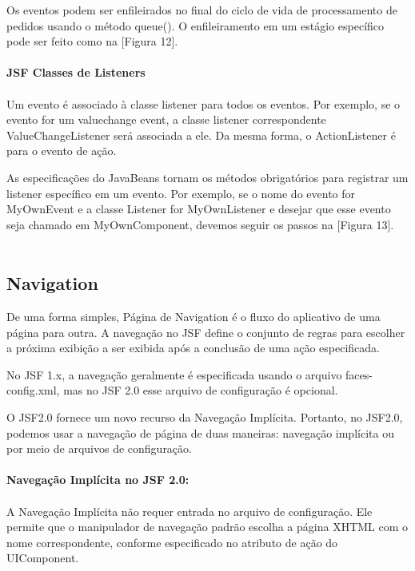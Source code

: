 \documentclass[	DIV=calc,%
							paper=a4,%
							fontsize=12pt,%
							onecolumn]{scrartcl}	 					%
\begin{document}
Os eventos podem ser enfileirados no final do ciclo de vida de processamento de pedidos usando o método queue(). O enfileiramento em um estágio específico pode ser feito como na [Figura 12].\\~\\

\textbf{JSF Classes de Listeners}\\~\\

Um evento é associado à classe listener para todos os eventos. Por exemplo, se o evento for um valuechange event, a classe listener correspondente ValueChangeListener será associada a ele. Da mesma forma, o ActionListener é para o evento de ação.

As especificações do JavaBeans tornam os métodos obrigatórios para registrar um listener específico em um evento. Por exemplo, se o nome do evento for MyOwnEvent e a classe Listener for MyOwnListener e desejar que esse evento seja chamado em MyOwnComponent, devemos seguir os passos na [Figura 13].\\~\\


\subsection{Navigation}

De uma forma simples, Página de Navigation é o fluxo do aplicativo de uma página para outra. A navegação no JSF define o conjunto de regras para escolher a próxima exibição a ser exibida após a conclusão de uma ação especificada.

No JSF 1.x, a navegação geralmente é especificada usando o arquivo faces-config.xml, mas no JSF 2.0 esse arquivo de configuração é opcional.

O JSF2.0 fornece um novo recurso da Navegação Implícita. Portanto, no JSF2.0, podemos usar a navegação de página de duas maneiras: navegação implícita ou por meio de arquivos de configuração.\\~\\

\textbf{Navegação Implícita no JSF 2.0:}\\~\\

A Navegação Implícita não requer entrada no arquivo de configuração. Ele permite que o manipulador de navegação padrão escolha a página XHTML com o nome correspondente, conforme especificado no atributo de ação do UIComponent.
\end{document}
